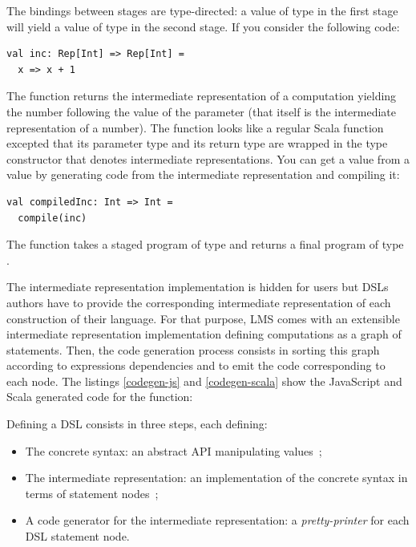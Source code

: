 \documentclass[american,english,runningheads]{llncs}
\begin{document}
The bindings between stages are type-directed: a value of type  in the first stage will yield a value of type  in the second stage. If you consider the following code:
\begin{lstlisting}
val inc: Rep[Int] => Rep[Int] =
  x => x + 1
\end{lstlisting}
The  function returns the intermediate representation of a computation yielding the number following the value of the parameter  (that itself is the intermediate representation of a number). The function looks like a regular Scala function excepted that its parameter type and its return type are wrapped in the  type constructor that denotes intermediate representations. You can get a  value from a  value by generating code from the intermediate representation and compiling it:
\begin{lstlisting}
val compiledInc: Int => Int =
  compile(inc)
\end{lstlisting}
The  function takes a staged program of type  and returns a final program of type .

The intermediate representation implementation is hidden for users but DSLs authors have to provide the corresponding intermediate representation of each construction of their language. For that purpose, LMS comes with an extensible intermediate representation implementation defining computations as a graph of statements. Then, the code generation process consists in sorting this graph according to expressions dependencies and to emit the code corresponding to each node. The listings \ref{codegen-js} and \ref{codegen-scala} show the JavaScript and Scala generated code for the  function:
\begin{multicols}{2}


\end{multicols}

Defining a DSL consists in three steps, each defining:

\begin{itemize}
\item The concrete syntax: an abstract API manipulating  values~;
\item The intermediate representation: an implementation of the concrete syntax in terms of statement nodes~;
\item A code generator for the intermediate representation: a \emph{pretty-printer} for each DSL statement node.
\end{itemize}
\end{document}
